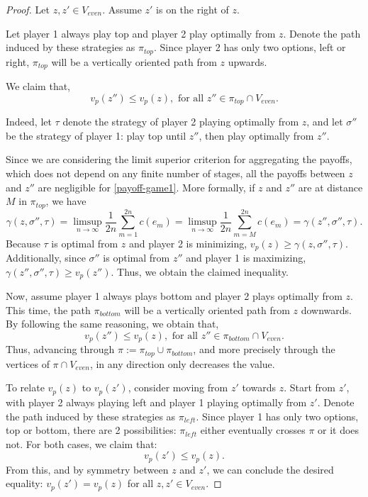 \begin{proof}
    Let $z, z' \in V_{even}$. Assume $z'$ is on the right of $z$. 

    Let player 1 always play top and player 2 play optimally from $z$. Denote the path induced by these strategies as $\pi_{top}$. Since player 2 has only two options, left or right, $\pi_{top}$ will be a vertically oriented path from $z$ upwards.

    We claim that,
    \begin{equation}\label{inequality-v-top}
        v_p(z'') \leq v_p(z), \text{ for all $z'' \in \pi_{top} \cap V_{even}$.}
    \end{equation} 

    Indeed, let $\tau$ denote the strategy of player 2 playing optimally from $z$, and let $\sigma''$ be the strategy of player 1: play top until $z''$, then play optimally from $z''$.

    Since we are considering the limit superior criterion for aggregating the payoffs, which does not depend on any finite number of stages, all the payoffs between $z$ and $z''$ are negligible for \eqref{payoff-game1}. More formally, if $z$ and $z''$ are at distance $M$ in $\pi_{top}$, we have
    \begin{equation*}%
        \gamma(z, \sigma'', \tau) = \limsup_{n \to \infty}\frac{1}{2n}\sum_{m = 1}^{2n}c(e_m) = \limsup_{n \to \infty}\frac{1}{2n}\sum_{m = M}^{2n}c(e_m) = \gamma(z'', \sigma'', \tau).
    \end{equation*}
    Because $\tau$ is optimal from $z$ and player 2 is minimizing, $v_p(z) \geq \gamma(z, \sigma'', \tau)$. Additionally, since $\sigma''$ is optimal from $z''$ and player 1 is maximizing, $\gamma(z'', \sigma'', \tau) \geq v_p(z'')$. Thus, we obtain the claimed inequality. 

    Now, assume player 1 always plays bottom and player 2 plays optimally from $z$. This time, the path $\pi_{bottom}$ will be a vertically oriented path from $z$ downwards. By following the same reasoning, we obtain that,
    \begin{equation}\label{inequality-v-bottom}
        v_p(z'') \leq v_p(z), \text{ for all $z'' \in \pi_{bottom} \cap V_{even}$.}
    \end{equation} 
    Thus, advancing through $\pi := \pi_{top} \cup \pi_{bottom}$, and more precisely through the vertices of $\pi \cap V_{even}$, in any direction only decreases the value.

    To relate $v_p(z)$ to $v_p(z')$, consider moving from $z'$ towards $z$. Start from $z'$, with player 2 always playing left and player 1 playing optimally from $z'$. Denote the path induced by these strategies as $\pi_{left}$. Since player 1 has only two options, top or bottom, there are 2 possibilities: $\pi_{left}$ either eventually crosses $\pi$ or it does not. For both cases, we claim that:
    \begin{equation} \label{inequality-zprime-zhat-z}
          v_p(z') \leq v_p(z).
    \end{equation} 
    From this, and by symmetry between $z$ and $z'$, we can conclude the desired equality: $v_p(z') = v_p(z)$ for all $z, z' \in V_{even}$.  


\end{proof}
